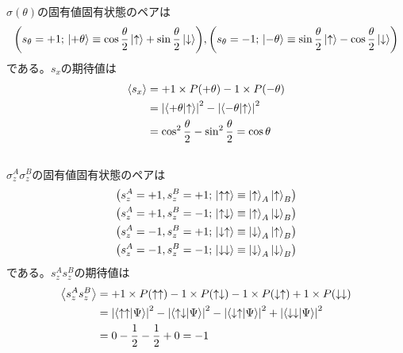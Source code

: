 \documentclass[../../sp_2019.tex]{subfiles}
\begin{document}
\subsection{}
\(\sigma(\theta)\)の固有値固有状態のペアは
\begin{equation}\begin{aligned}[b]
    \qty(s_\theta = +1;\,\ket{+\theta}\equiv \cos\frac{\theta}{2}\ket{\uparrow}+\sin\frac{\theta}{2}\ket{\downarrow}),
    \qty(s_\theta = -1;\,\ket{-\theta}\equiv \sin\frac{\theta}{2}\ket{\uparrow}-\cos\frac{\theta}{2}\ket{\downarrow})
\end{aligned}\end{equation}
である。\(s_x\)の期待値は
\begin{equation}\begin{aligned}[b]
    \ev{s_x} &= +1\times P(+\theta)-1\times P(-\theta) \\
    &= \abs{\braket{+\theta}{\uparrow}}^2-\abs{\braket{-\theta}{\uparrow}}^2\\
    &= \cos^2\frac{\theta}{2}-\sin^2\frac{\theta}{2} =\cos\theta
\end{aligned}\end{equation}

\subsection{}
\(\sigma_z^A\sigma_z^B\)の固有値固有状態のペアは
\begin{equation}\begin{aligned}[b]
    &\qty(s_z^A = +1,s_z^B = +1;\,\ket{\uparrow\uparrow} \equiv \ket{\uparrow}_A\ket{\uparrow}_B)\\
    &\qty(s_z^A = +1,s_z^B = -1;\,\ket{\uparrow\downarrow} \equiv \ket{\uparrow}_A\ket{\downarrow}_B)\\
    &\qty(s_z^A = -1,s_z^B = +1;\,\ket{\downarrow\uparrow} \equiv \ket{\downarrow}_A\ket{\uparrow}_B)\\
    &\qty(s_z^A = -1,s_z^B = -1;\,\ket{\downarrow\downarrow} \equiv \ket{\downarrow}_A\ket{\downarrow}_B)
\end{aligned}\end{equation}
である。\(s_z^As_z^B\)の期待値は
\begin{equation}\begin{aligned}[b]
    \ev{s_z^As_z^B}
    &= +1\times P(\uparrow\uparrow) -1\times P(\uparrow\downarrow)
        -1\times P(\downarrow\uparrow) +1\times P(\downarrow\downarrow)\\
    &= \abs{\braket{\uparrow\uparrow}{\Psi}}^2 -\abs{\braket{\uparrow\downarrow}{\Psi}}^2
        -\abs{\braket{\downarrow\uparrow}{\Psi}}^2+\abs{\braket{\downarrow\downarrow}{\Psi}}^2\\
    &= 0 -\frac{1}{2} -\frac{1}{2} +0 = -1
\end{aligned}\end{equation}
\end{document}
